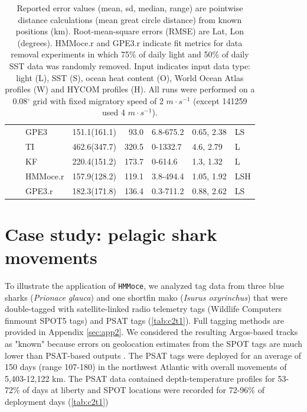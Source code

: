 \begin{table}[h!]
\begin{tabular}[t]{lrllrlll}
 &  & GPE3 & 151.1(161.1) & 93.0 & 6.8-675.2 & 0.65, 2.38 & LS\\
 &  & TI & 462.6(347.7) & 320.5 & 0-1332.7 & 4.6, 2.79 & L\\
 &  & KF & 220.4(151.2) & 173.7 & 0-614.6 & 1.3, 1.32 & L\\
 &  & HMMoce.r & 157.9(128.2) & 119.1 & 3.8-494.4 & 1.05, 1.92 & LSH\\
 &  & GPE3.r & 182.3(171.8) & 136.4 & 0.3-711.2 & 0.88, 2.62 & LS\\
\bottomrule
\end{tabular}
\caption*{Reported error values (mean, sd, median, range) are pointwise distance calculations (mean great circle distance) from known positions (km). Root-mean-square errors (RMSE) are Lat, Lon (degrees). HMMoce.r and GPE3.r indicate fit metrics for data removal experiments in which 75\% of daily light and 50\% of daily SST data was randomly removed. Input indicates input data type: light (L), SST (S), ocean heat content (O), World Ocean Atlas profiles (W) and HYCOM profiles (H). All runs were performed on a 0.08$^{\circ}$ grid with fixed
migratory speed of 2 $m \cdot s^{-1}$ (except 141259 used 4 $m \cdot s^{-1}$).}
\end{table}

\section{Case study: pelagic shark
movements}

To illustrate the application of \texttt{HMMoce}, we analyzed tag data
from three blue sharks (\emph{Prionace glauca}) and one shortfin mako
(\emph{Isurus oxyrinchus}) that were double-tagged with satellite-linked
radio telemetry tags (Wildlife Computers finmount SPOT5 tags) and PSAT
tags (\cref{tab:c2t1}). Full tagging methods are provided in Appendix \ref{sec:app2}. We considered the resulting Argos-based tracks as "known"
because errors on geolocation estimates from the SPOT tags are much
lower \citep[typically \textless{} 10 km;][]{Witt2010, Patterson2010}
than PSAT-based outputs \citep[\textgreater{} 50 km;][]{Winship2012}.
The PSAT tags were deployed for an average of 150 days (range 107-180)
in the northwest Atlantic with overall movements of 5,403-12,122 km. The
PSAT data contained depth-temperature profiles for 53-72\% of days at
liberty and SPOT locations were recorded for 72-96\% of deployment days
(\cref{tab:c2t1})

